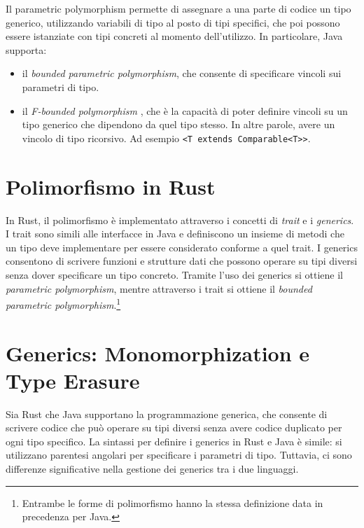 Il parametric polymorphism permette di assegnare a una parte di codice un tipo generico, utilizzando variabili di tipo al posto di tipi specifici, che poi possono essere istanziate con tipi concreti al momento dell'utilizzo. In particolare, Java supporta:
\begin{itemize}
    \item il \textit{bounded parametric polymorphism}, che consente di specificare vincoli sui parametri di tipo.
    \item il \textit{F-bounded polymorphism} \cite{greenman-effing-bound-polymorphism}, che è la capacità di poter definire vincoli su un tipo generico che dipendono da quel tipo stesso. In altre parole, avere un vincolo di tipo ricorsivo. Ad esempio \texttt{<T extends Comparable<T>}\texttt{>}.
\end{itemize}
\section{Polimorfismo in Rust}
In Rust, il polimorfismo è implementato attraverso i concetti di \textit{trait} e i \textit{generics}. I trait sono simili alle interfacce in Java e definiscono un insieme di metodi che un tipo deve implementare per essere considerato conforme a quel trait. I generics consentono di scrivere funzioni e strutture dati che possono operare su tipi diversi senza dover specificare un tipo concreto. Tramite l'uso dei generics si ottiene il \textit{parametric polymorphism}, mentre attraverso i trait si ottiene il \textit{bounded parametric polymorphism}.\footnote{Entrambe le forme di polimorfismo hanno la stessa definizione data in precedenza per Java.}

\section{Generics: Monomorphization e Type Erasure}
\label{sec:generics}
Sia Rust che Java supportano la programmazione generica, che consente di scrivere codice che può operare su tipi diversi senza avere codice duplicato per ogni tipo specifico. La sintassi per definire i generics in Rust e Java è simile: si utilizzano parentesi angolari per specificare i parametri di tipo. Tuttavia, ci sono differenze significative nella gestione dei generics tra i due linguaggi.

